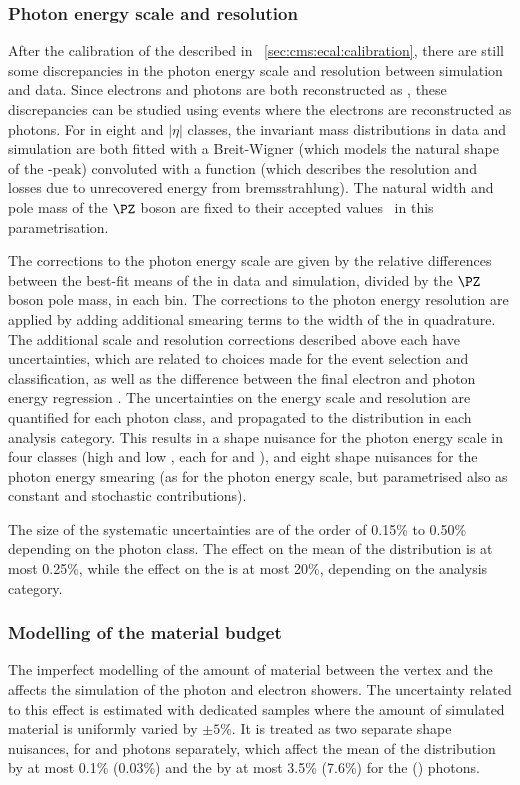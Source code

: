 \subsubsection{Photon energy scale and resolution}
After the calibration of the \ECAL described in \Sec~\ref{sec:cms:ecal:calibration}, there are still some discrepancies in the photon energy scale and resolution between simulation and data. Since electrons and photons are both reconstructed as \SC\s, these discrepancies can be studied using \Zee events where the electrons are reconstructed as photons.
For \SC\s in eight \RNINE and $|\eta|$ classes, the invariant mass distributions in data and simulation are both fitted with a Breit-Wigner (which models the natural shape of the \PZ-peak) convoluted with a \CB function (which describes the \ECAL resolution and losses due to unrecovered energy from bremsstrahlung). The natural width and pole mass of the $\PZ$ boson are fixed to their accepted values~\cite{PDGBooklet} in this parametrisation. 

The corrections to the photon energy scale are given by the relative differences between the best-fit means of the \CB in data and simulation, divided by the $\PZ$ boson pole mass, in each bin. The corrections to the photon energy resolution are applied by adding additional smearing terms to the width of the \CB in quadrature. The additional scale and resolution corrections described above each have uncertainties, which are related to choices made for the \Zee event selection and classification, as well as the difference between the final electron and photon energy regression \BDT\s. The uncertainties on the energy scale and resolution are quantified for each photon class, and propagated to the \mgg distribution in each analysis category. This results in a shape nuisance for the photon energy scale in four classes (high and low \RNINE, each for \EB and \EE), and eight shape nuisances for the photon energy smearing (as for the photon energy scale, but parametrised also as constant and stochastic contributions). 

The size of the systematic uncertainties are of the order of 0.15\% to 0.50\% depending on the photon class. The effect on the mean of the \mgg distribution is at most 0.25\%, while the effect on the \effSigma is at most 20\%, depending on the analysis category.


\subsubsection{Modelling of the material budget}
The imperfect modelling of the amount of material between the vertex and the \ECAL affects the simulation of the photon and electron showers. The uncertainty related to this effect is estimated with dedicated samples where the amount of simulated material is uniformly varied by $\pm 5\%$. It is treated as two separate shape nuisances, for \EB and \EE photons separately, which affect the mean of the \mgg distribution by at most 0.1\% (0.03\%) and the \effSigma by at most 3.5\% (7.6\%) for the \EB (\EE) photons.

